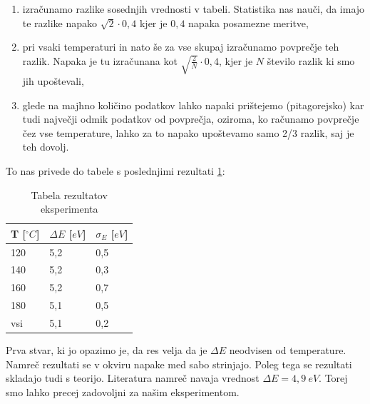 \documentclass[10pt]{article}
\begin{document}
\begin{enumerate}
    \item izračunamo razlike sosednjih vrednosti v tabeli. Statistika nas nauči, da imajo te razlike napako $\sqrt{2} \cdot 0,4$ kjer je $0,4$ napaka posamezne meritve,
    \item pri vsaki temperaturi in nato še za vse skupaj izračunamo povprečje teh razlik. Napaka je tu izračunana kot $\sqrt{\frac{2}{N}}\cdot 0,4$, kjer je $N$ število razlik ki smo jih upoštevali,
    \item glede na majhno količino podatkov lahko napaki prištejemo (pitagorejsko) kar tudi največji odmik podatkov od povprečja, oziroma, ko računamo povprečje čez vse temperature, lahko za to napako upoštevamo samo 2/3 razlik, saj je teh dovolj.
\end{enumerate}

To nas privede do tabele s poslednjimi rezultati \ref{rezultati}:

\begin{table}[h]
    \begin{center}
    \begin{tabular}{l|l|l}
    T [$^{\circ}C$]  & $\Delta E$  [$eV$] & $\sigma_E$ [$eV$] \\ \hline
    120 & 5,2 & 0,5   \\
    140 & 5,2 & 0,3   \\
    160 & 5,2 & 0,7   \\
    180 & 5,1 & 0,5   \\
    vsi & 5,1 & 0,2  
    \end{tabular}
    \caption{Tabela rezultatov eksperimenta}
    \label{rezultati}
    \end{center}
\end{table}


Prva stvar, ki jo opazimo je, da res velja da je $\Delta E$ neodvisen od temperature. Namreč rezultati se v okviru napake med sabo strinjajo. Poleg tega se rezultati skladajo tudi s teorijo. Literatura namreč navaja vrednost $\Delta E = 4,9\ eV$. Torej smo lahko precej zadovoljni za našim eksperimentom.
\end{document}

